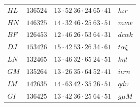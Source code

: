 \documentclass[11pt,a4paper]{article}
\theoremstyle{definition}
\begin{document}
\begin{center}
\begin{tabular}{llll}
$HL$ & $136524$ & $13 \cdot 52\ 36 \cdot 24\ 65 \cdot 41$ & $h\iota r$\\
$HN$ & $146325$ & $14 \cdot 32\ 46 \cdot 25\ 63 \cdot 51$ & $m\nu w$\\
$BF$ & $126453$ & $12 \cdot 46\ 26 \cdot 53\ 64 \cdot 31$ & $dc\alpha k$\\
$DJ$ & $153426$ & $15 \cdot 42\ 53 \cdot 26\ 34 \cdot 61$ & $t\alpha\xi$\\
$LN$ & $132465$ & $13 \cdot 46\ 32 \cdot 65\ 24 \cdot 51$ & $k\eta t$\\
$GM$ & $135264$ & $13 \cdot 26\ 35 \cdot 64\ 52 \cdot 41$ & $i\iota rn$\\
$IM$ & $142635$ & $14 \cdot 63\ 42 \cdot 35\ 26 \cdot 51$ & $qd\upsilon$\\
$GI$ & $136425$ & $13 \cdot 42\ 36 \cdot 25\ 64 \cdot 51$ & $g\mu M$
\end{tabular}
\end{center}

\newpage
\end{document}
